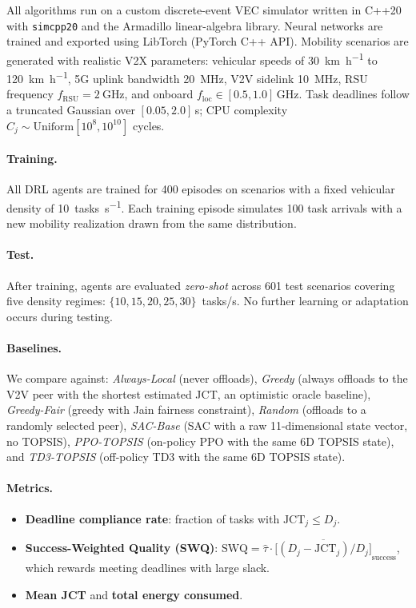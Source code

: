 \documentclass[iicol]{sn-jnl}
\begin{document}
All algorithms run on a custom discrete-event VEC simulator written in C++20
with \texttt{simcpp20} and the Armadillo linear-algebra library.
Neural networks are trained and exported using LibTorch (PyTorch C++ API).
Mobility scenarios are generated with realistic V2X parameters: vehicular
speeds of \SI{30}{\kilo\meter\per\hour} to \SI{120}{\kilo\meter\per\hour},
5G uplink bandwidth \SI{20}{\mega\hertz}, V2V sidelink \SI{10}{\mega\hertz},
RSU frequency $f_{\mathrm{RSU}} = \SI{2}{\giga\hertz}$, and onboard
$f_{\mathrm{loc}} \in [0.5, 1.0]$\,GHz.
Task deadlines follow a truncated Gaussian over $[0.05, 2.0]$\,s;
CPU complexity $C_j \sim \mathrm{Uniform}[10^8, 10^{10}]$ cycles.

\paragraph{Training.}
All DRL agents are trained for 400 episodes on scenarios with a fixed
vehicular density of \SI{10}{tasks\per\second}.
Each training episode simulates 100 task arrivals with a new mobility
realization drawn from the same distribution.

\paragraph{Test.}
After training, agents are evaluated \emph{zero-shot} across 601 test
scenarios covering five density regimes:
$\{10, 15, 20, 25, 30\}$~tasks/s.
No further learning or adaptation occurs during testing.

\paragraph{Baselines.}
We compare against:
\emph{Always-Local} (never offloads),
\emph{Greedy} (always offloads to the V2V peer with the shortest estimated
JCT, an optimistic oracle baseline),
\emph{Greedy-Fair} (greedy with Jain fairness constraint),
\emph{Random} (offloads to a randomly selected peer),
\emph{SAC-Base} (SAC with a raw 11-dimensional state vector, no TOPSIS),
\emph{PPO-TOPSIS} (on-policy PPO with the same 6D TOPSIS state),
and \emph{TD3-TOPSIS} (off-policy TD3 with the same 6D TOPSIS state).

\paragraph{Metrics.}
\begin{itemize}[nosep,leftmargin=*]
  \item \textbf{Deadline compliance rate}: fraction of tasks with
        $\mathrm{JCT}_j \le D_j$.
  \item \textbf{Success-Weighted Quality (SWQ)}:
        $\mathrm{SWQ} = \hat{\tau} \cdot
         \overline{\bigl[(D_j - \mathrm{JCT}_j)/D_j\bigr]}_{\mathrm{success}}$,
        which rewards meeting deadlines with large slack.
  \item \textbf{Mean JCT} and \textbf{total energy consumed}.
\end{itemize}
\end{document}
